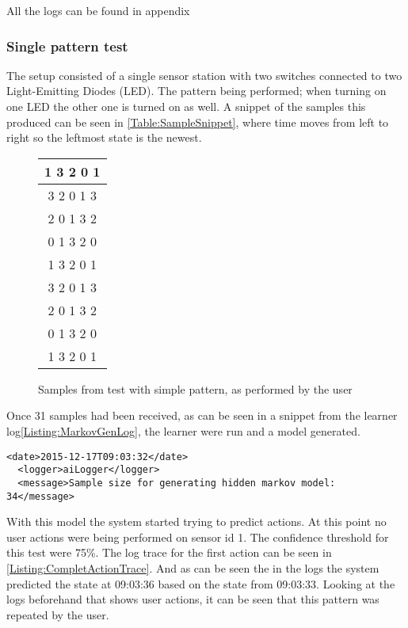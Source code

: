 All the logs can be found in appendix 
\subsubsection{Single pattern test}
The setup consisted of a single sensor station with two switches connected to two Light-Emitting Diodes (LED). The pattern being performed; when turning on one LED the other one is turned on as well. A snippet of the samples this produced can be seen in \cref{Table:SampleSnippet}, where time moves from left to right so the leftmost state is the newest.
\begin{center}
\begin{figure}
	\begin{tabular}{ | c | }
			\hline
		1 3 2 0 1 \\ \hline
		3 2 0 1 3 \\ \hline
		2 0 1 3 2 \\ \hline
		0 1 3 2 0 \\ \hline
		1 3 2 0 1 \\ \hline
		3 2 0 1 3 \\ \hline
		2 0 1 3 2 \\ \hline
		0 1 3 2 0 \\ \hline
		1 3 2 0 1  \hline
	\end{tabular}
	\caption{Samples from test with simple pattern, as performed by the user}
\end{figure}
\label{Table:SampleSnippet}
\end{center}
Once 31 samples had been received, as can be seen in a snippet from the learner log\cref{Listing:MarkovGenLog}, the learner were run and a model generated.
\lstset{language=xml}
\begin{lstlisting}[label = Listing:MarkovGenLog, caption = Snippet of log from model generation]
  <date>2015-12-17T09:03:32</date>
  <logger>aiLogger</logger>
  <message>Sample size for generating hidden markov model: 34</message>
\end{lstlisting}
With this model the system started trying to predict actions. At this point no user actions were being performed on sensor id 1. The confidence threshold for this test were 75\%. The log trace for the first action can be seen in \cref{Listing:CompletActionTrace}. And as can be seen the in the logs the system predicted the state at 09:03:36 based on the state from 09:03:33. Looking at the logs beforehand that shows user actions, it can be seen that this pattern was repeated by the user.
